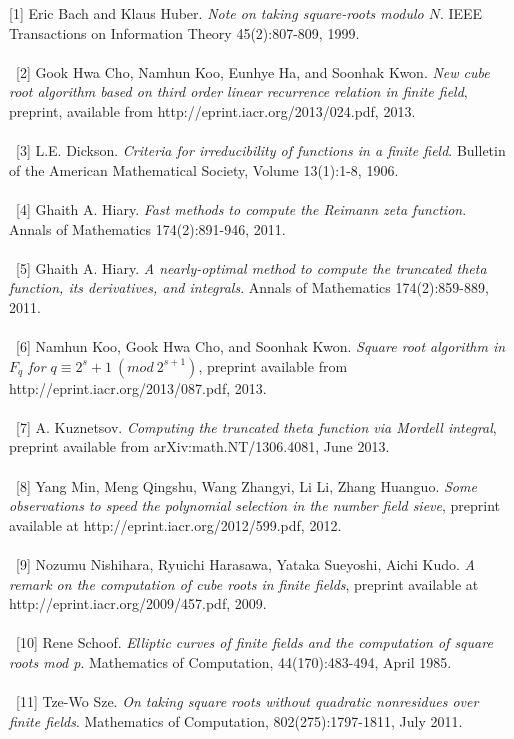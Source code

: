 \documentclass[final,letterpaper,oneside,10pt]{article}
\begin{document}
[1] Eric Bach and Klaus Huber. \textit{Note on taking square-roots modulo $N$}.  IEEE Transactions on Information Theory 45(2):807-809, 1999.
\\
\\
\
[2] Gook Hwa Cho, Namhun Koo, Eunhye Ha, and Soonhak Kwon. \textit{New cube root algorithm based on third order linear recurrence relation in
finite field}, preprint, available from http://eprint.iacr.org/2013/024.pdf, 2013.
\\
\\
\
[3] L.E. Dickson. \textit{Criteria for irreducibility of functions in a finite field}.  Bulletin of the American Mathematical Society, Volume 13(1):1-8, 1906.
\\
\\
\
[4] Ghaith A. Hiary. \textit{Fast methods to compute the Reimann zeta function}.  Annals of Mathematics 174(2):891-946, 2011.
\\
\\
\
[5] Ghaith A. Hiary. \textit{A nearly-optimal method to compute the truncated theta function, its derivatives, and integrals}.  Annals of Mathematics 
174(2):859-889, 2011.
\\
\\
\
[6] Namhun Koo, Gook Hwa Cho, and Soonhak Kwon. \textit{Square root algorithm in $F_q$ for $q \equiv 2^s+1~(mod~2^{s+1})$}, preprint available
from 
\\
 http://eprint.iacr.org/2013/087.pdf, 2013.
\\
\\
\
[7]  A. Kuznetsov. \textit{Computing the truncated theta function via Mordell integral}, preprint available from arXiv:math.NT/1306.4081, June 2013.
\\
\\
\
[8] Yang Min, Meng Qingshu, Wang Zhangyi, Li Li, Zhang Huanguo. \textit{Some observations to speed the polynomial selection in the number field
sieve}, preprint available at http://eprint.iacr.org/2012/599.pdf, 2012.
\\
\\
\
[9] Nozumu Nishihara, Ryuichi Harasawa, Yataka Sueyoshi, Aichi Kudo. \textit{A remark on the computation of cube roots in finite fields}, preprint
available at http://eprint.iacr.org/2009/457.pdf, 2009.
\\
\\
\
[10] Rene Schoof. \textit{Elliptic curves of finite fields and the computation of square roots mod p}.  Mathematics of Computation, 44(170):483-494,
April 1985.
\\
\\
\
[11] Tze-Wo Sze. \textit{On taking square roots without quadratic nonresidues over finite fields}.  Mathematics of Computation, 802(275):1797-1811, 
July 2011.
\end{document}
